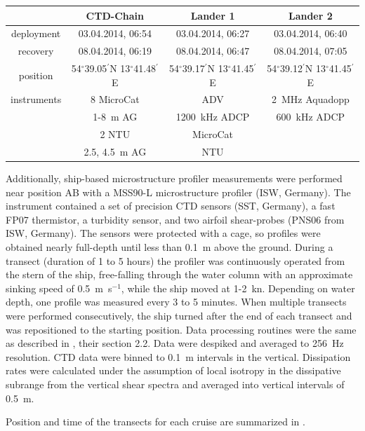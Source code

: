 \begin{table}
\begin{center}
\begin{tabular}{cccc}
& CTD-Chain & Lander 1 & Lander 2 \\
\hline
 deployment & 03.04.2014, 06:54 & 03.04.2014, 06:27 & 03.04.2014, 06:40 \\ 
 recovery & 08.04.2014, 06:19 & 08.04.2014, 06:47 & 08.04.2014, 07:05 \\
\hline
position & 54$^\circ$39.05$^\prime$N 13$^\circ$41.48$^\prime$E & 
54$^\circ$39.17$^\prime$N 13$^\circ$41.45$^\prime$E & 54$^\circ$39.12$^\prime$N 
13$^\circ$41.45$^\prime$E \\
\hline
instruments & 8 MicroCat & ADV & 2~MHz Aquadopp \\
 & 1-8~m AG & 1200~kHz ADCP & 600~kHz ADCP\\
 & 2 NTU & MicroCat & \\
 & 2.5, 4.5~m AG & NTU & \\
 \end{tabular}
\end{center}
\end{table}

Additionally, ship-based microstructure profiler measurements were performed 
near position AB with a MSS90-L microstructure profiler (ISW, Germany). The 
instrument contained a set of 
precision CTD sensors (SST, Germany), a fast FP07 thermistor, a turbidity 
sensor, and two airfoil shear-probes (PNS06 from ISW, Germany). The 
sensors were protected with a cage, so profiles were obtained nearly full-depth 
until less than 0.1~m above the ground. During a transect (duration of 1 to 5 
hours) the profiler was continuously operated from the stern of the ship, 
free-falling through the water column with an approximate sinking speed of 
0.5~m~s$^{-1}$, while the ship moved at 1-2~kn. Depending on water depth, one 
profile was measured every 3 to 5 minutes. When multiple transects 
were performed consecutively, the ship turned after the end of each transect 
and was repositioned to the starting position. 
Data processing routines were the same as described in \cite{vanderlee2011}, 
their section 2.2. Data were despiked and averaged to 256~Hz resolution. 
CTD data were binned to 0.1~m intervals in the vertical. Dissipation rates were 
calculated under the assumption of local isotropy in the dissipative subrange 
from the vertical shear spectra and averaged into vertical intervals of 0.5~m.

Position and time of the transects for each cruise are summarized in 
.

